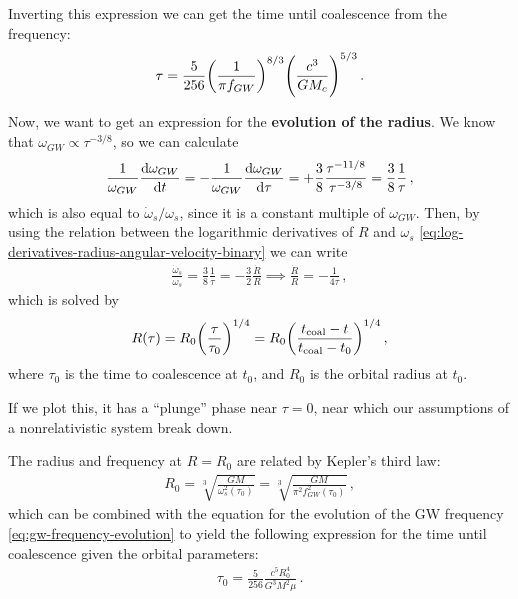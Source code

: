 \documentclass[main.tex]{subfiles}
\begin{document}

Inverting this expression we can get the time until coalescence from the frequency: 
%
\begin{align}
\tau = \frac{5}{256} \qty( \frac{1}{\pi f_{GW}})^{8/3} \qty( \frac{c^3}{G M_c})^{5/3}
\,.
\end{align}

Now, we want to get an expression for the \textbf{evolution of the radius}. We know that \(\omega_{GW} \propto \tau^{-3/8}\), so we can calculate 
%
\begin{align}
\frac{1}{\omega_{GW}} \dv{\omega_{GW}}{t} = 
- \frac{1}{\omega_{GW}} \dv{\omega_{GW}}{\tau } = 
+ \frac{3}{8} \frac{\tau^{-11/8}}{\tau^{-3/8} }
= \frac{3}{8} \frac{1}{\tau }
\,,
\end{align}
%
which is also equal to \(\dot{\omega}_{s} / \omega_{s}\), since it is a constant multiple of \(\omega_{GW}\). Then, by using the relation between the logarithmic derivatives of \(R\) and \(\omega_{s}\) \eqref{eq:log-derivatives-radius-angular-velocity-binary} we can write 
%
\begin{align}
\frac{\dot{\omega}_{s}}{\omega_{s}} = \frac{3}{8} \frac{1}{\tau } = - \frac{3}{2} \frac{\dot{R}}{R} 
\implies \frac{\dot{R}}{R} = - \frac{1}{4 \tau }
\,,
\end{align}
%
which is solved by 
%
\begin{align}
R(\tau ) = R_0 \qty(\frac{\tau }{\tau_0 })^{1/4} = R_0 \qty(\frac{t _{\text{coal}} - t}{t _{\text{coal}} - t_0 })^{1/4}
\,,
\end{align}
%
where \(\tau_0 \) is the time to coalescence at \(t_0 \), and \(R_0 \) is the orbital radius at \(t_0 \). 

If we plot this, it has a ``plunge'' phase near \(\tau = 0\), near which our assumptions of a nonrelativistic system break down. 


The radius and frequency at \(R = R_0 \) are related by Kepler's third law: 
%
\begin{align}
R_0 = \sqrt[3]{ \frac{GM}{\omega_{s}^2 (\tau_0 )}}
= \sqrt[3]{ \frac{GM}{\pi^2 f_{GW}^2 (\tau_0 )}}
\,,
\end{align}
%
which can be combined with the equation for the evolution of the GW frequency \eqref{eq:gw-frequency-evolution} to yield the following expression for the time until coalescence given the orbital parameters: 
%
\begin{align}
\tau_0 = \frac{5}{256}  \frac{c^{5} R_0^{4}}{G^3M^2 \mu }
\,.
\end{align}
\end{document}
